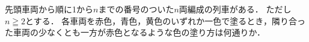 \documentclass[../../main.tex]{subfiles}
\begin{document}
先頭車両から順に1から$n$までの番号のついた$n$両編成の列車がある．
ただし$n \geqq 2$とする．
各車両を赤色，青色，黄色のいずれか一色で塗るとき，隣り合った車両の少なくとも一方が赤色となるような色の塗り方は何通りか．
\end{document}
